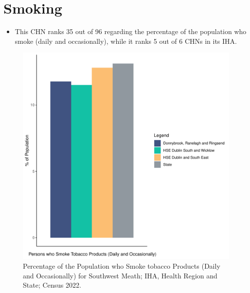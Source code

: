 \documentclass{article}
\begin{document}
\pagebreak

\section{Smoking}\label{sect:Smoking}
\begin{itemize}
\item This CHN ranks  35 out of 96 regarding the percentage of the population who smoke (daily and occasionally), while it ranks   5 out of 6 CHNs in its IHA.
\end{itemize}
\begin{figure}[H]
	\centering
	\includegraphics[width = 120mm]{../figures/SmokingED.pdf}
	\caption{Percentage of the Population who Smoke tobacco Products (Daily and Occasionally) for Southwest Meath; IHA, Health Region and State; Census 2022.}
	\label{fig:2ae19629-1a6a-13a3-e055-000000000001}
	\end{figure}
	
\end{document}
